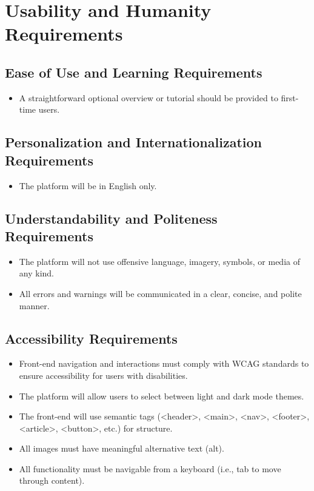 \documentclass[12pt]{article}
\begin{document}
\section{Usability and Humanity Requirements}
  \subsection{Ease of Use and Learning Requirements}
    \begin{itemize}
      \item A straightforward optional overview or tutorial should be provided to first-time users.
    \end{itemize}

  \subsection{Personalization and Internationalization Requirements}
    \begin{itemize}
      \item The platform will be in English only.
    \end{itemize}

  \subsection{Understandability and Politeness Requirements}
    \begin{itemize}
      \item The platform will not use offensive language, imagery, symbols, or media of any kind.
      \item All errors and warnings will be communicated in a clear, concise, and polite manner.
    \end{itemize}

  \subsection{Accessibility Requirements}
    \begin{itemize}
      \item Front-end navigation and interactions must comply with WCAG standards to ensure accessibility for users with disabilities.
      \item The platform will allow users to select between light and dark mode themes.
      \item The front-end will use semantic tags (<header>, <main>, <nav>, <footer>, <article>, <button>, etc.) for structure.
      \item All images must have meaningful alternative text (alt).
      \item All functionality must be navigable from a keyboard (i.e., tab to move through content).
    \end{itemize}
\end{document}
